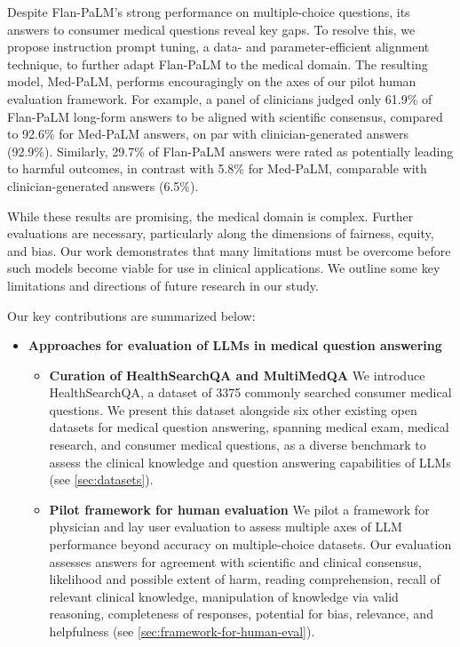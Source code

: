 \documentclass[10pt, letter, onecolumn]{arxiv}
\begin{document}
\begin{refsection}
Despite Flan-PaLM's strong performance on multiple-choice questions, its answers to consumer medical questions reveal key gaps. To resolve this, we propose instruction prompt tuning, a data- and parameter-efficient alignment technique, to further adapt Flan-PaLM to the medical domain. The resulting model, Med-PaLM, performs encouragingly on the axes of our pilot human evaluation framework. For example, a panel of clinicians judged only 61.9\% of Flan-PaLM long-form answers to be aligned with scientific consensus, compared to 92.6\% for Med-PaLM answers, on par with clinician-generated answers (92.9\%). Similarly, 29.7\% of Flan-PaLM answers were rated as potentially leading to harmful outcomes, in contrast with 5.8\% for Med-PaLM, comparable with clinician-generated answers (6.5\%).

While these results are promising, the medical domain is complex. Further evaluations are necessary, particularly along the dimensions of fairness, equity, and bias. Our work demonstrates that many limitations must be overcome before such models become viable for use in clinical applications. We outline some key limitations and directions of future research in our study.

Our key contributions are summarized below:

\begin{itemize}[leftmargin=1.5em,rightmargin=0em]
\setlength\itemsep{5pt}
\item \textbf{Approaches for evaluation of LLMs in medical question answering}

\begin{itemize}
    \item[-] \textbf{Curation of HealthSearchQA and MultiMedQA} We introduce HealthSearchQA, a dataset of 3375 commonly searched consumer medical questions. We present this dataset alongside six other existing open datasets for medical question answering, spanning medical exam, medical research, and consumer medical questions, as a diverse benchmark to assess the clinical knowledge and question answering capabilities of LLMs (see \cref{sec:datasets}).
    \item[-] \textbf{Pilot framework for human evaluation} We pilot a framework for physician and lay user evaluation to assess multiple axes of LLM performance beyond accuracy on multiple-choice datasets. Our evaluation assesses answers for agreement with scientific and clinical consensus, likelihood and possible extent of harm, reading comprehension, recall of relevant clinical knowledge, manipulation of knowledge via valid reasoning, completeness of responses, potential for bias, relevance, and helpfulness (see \cref{sec:framework-for-human-eval}).
    

\end{itemize}
\end{itemize}
\end{refsection}
\end{document}
